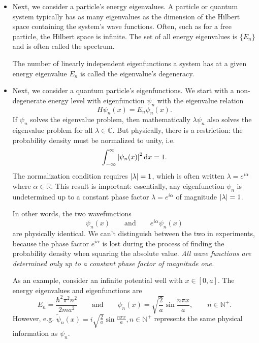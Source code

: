 \documentclass[11pt, a4paper]{article}
\newcommand{\diff}{\mathop{}\!\mathrm{d}} %
\newcommand{\eqtext}[1]{\qquad \text{#1} \qquad}
\begin{document}
\begin{itemize}
	\item Next, we consider a particle's energy eigenvalues. A particle or quantum system typically has as many eigenvalues as the dimension of the Hilbert space containing the system's wave functions. Often, such as for a free particle, the Hilbert space is infinite. The set of all energy eigenvalues is $ \{E_{n}\} $ and is often called the spectrum. 
	
	The number of linearly independent eigenfunctions a system has at a given energy eigenvalue $ E_{n} $ is called the eigenvalue's degeneracy.
	
	\item Next, we consider a quantum particle's eigenfunctions. We start with a non-degenerate energy level with eigenfunction $ \psi_{n} $ with the eigenvalue relation
	\begin{equation*}
		H\psi_{n}(x) = E_{n}\psi_{n}(x).
	\end{equation*}
	If $ \psi_{n} $ solves the eigenvalue problem, then mathematically $ \lambda \psi_{n} $ also solves the eigenvalue problem for all $ \lambda \in \mathbb{C} $. But physically, there is a restriction: the probability density must be normalized to unity, i.e. 
	\begin{equation*}
		\int_{-\infty}^{\infty} \abs{\psi_{n}(x)}^{2} \diff x = 1.
	\end{equation*}
	The normalization condition requires $ \abs{\lambda} = 1$, which is often written $ \lambda = e^{i \alpha} $ where $ \alpha \in \mathbb{R} $. This result is important: essentially, any eigenfunction $ \psi_{n} $ is undetermined up to a constant phase factor $ \lambda = e^{i\alpha} $ of magnitude $ \abs{\lambda} = 1 $. 

    In other words, the two wavefunctions
	\begin{equation*}
		\psi_{n}(x) \eqtext{and} e^{i \alpha}\psi_{n}(x)
	\end{equation*}
    are physically identical. We can't distinguish between the two in experiments, because the phase factor $ e^{i \alpha} $ is lost during the process of finding the probability density when squaring the absolute value. \textit{All wave functions are determined only up to a constant phase factor of magnitude one.}
	
    As an example, consider an infinite potential well with $ x \in [0, a] $. The energy eigenvalues and eigenfunctions are
	\begin{equation*}
		E_{n} = \frac{\hbar^{2} \pi^{2} n^{2}}{2ma^{2}} \eqtext{and} \psi_{n}(x) = \sqrt{\frac{2}{a}} \sin \frac{n\pi x}{a}, \qquad n \in \mathbb{N}^{+}.
	\end{equation*}
	However, e.g. $ \tilde{\psi}_{n}(x) = i \sqrt{\frac{2}{a}} \sin \frac{n\pi x}{a}, n \in \mathbb{N}^{+} $ represents the same physical information as $ \psi_{n} $. 
\end{itemize}
\end{document}
